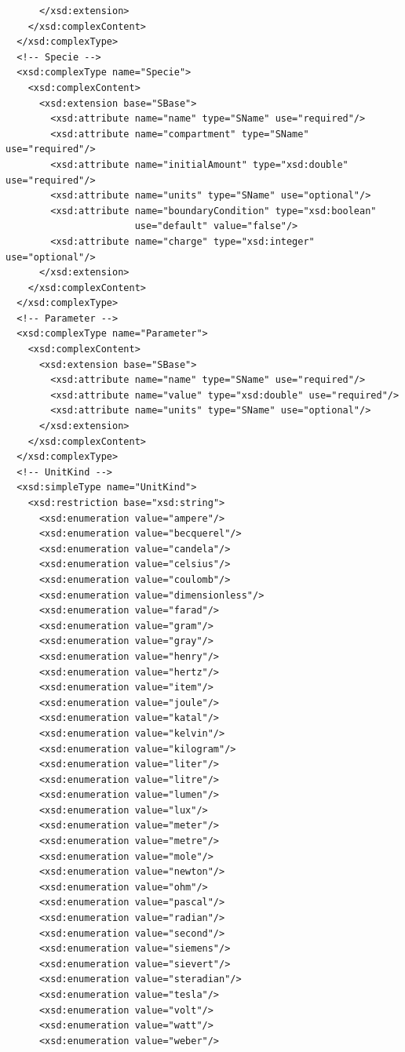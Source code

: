 \documentclass[10pt]{cekarticle}
\begin{document}
\begin{small}
\begin{verbatim}
      </xsd:extension>
    </xsd:complexContent>
  </xsd:complexType>
  <!-- Specie -->
  <xsd:complexType name="Specie">
    <xsd:complexContent>
      <xsd:extension base="SBase">
        <xsd:attribute name="name" type="SName" use="required"/>
        <xsd:attribute name="compartment" type="SName" use="required"/>
        <xsd:attribute name="initialAmount" type="xsd:double" use="required"/>
        <xsd:attribute name="units" type="SName" use="optional"/>
        <xsd:attribute name="boundaryCondition" type="xsd:boolean" 
                       use="default" value="false"/>
        <xsd:attribute name="charge" type="xsd:integer" use="optional"/>
      </xsd:extension>
    </xsd:complexContent>
  </xsd:complexType>
  <!-- Parameter -->
  <xsd:complexType name="Parameter">
    <xsd:complexContent>
      <xsd:extension base="SBase">
        <xsd:attribute name="name" type="SName" use="required"/>
        <xsd:attribute name="value" type="xsd:double" use="required"/>
        <xsd:attribute name="units" type="SName" use="optional"/>
      </xsd:extension>
    </xsd:complexContent>
  </xsd:complexType>
  <!-- UnitKind -->
  <xsd:simpleType name="UnitKind">
    <xsd:restriction base="xsd:string">
      <xsd:enumeration value="ampere"/>
      <xsd:enumeration value="becquerel"/>
      <xsd:enumeration value="candela"/>
      <xsd:enumeration value="celsius"/>
      <xsd:enumeration value="coulomb"/>
      <xsd:enumeration value="dimensionless"/>
      <xsd:enumeration value="farad"/>
      <xsd:enumeration value="gram"/>
      <xsd:enumeration value="gray"/>
      <xsd:enumeration value="henry"/>
      <xsd:enumeration value="hertz"/>
      <xsd:enumeration value="item"/>
      <xsd:enumeration value="joule"/>
      <xsd:enumeration value="katal"/>
      <xsd:enumeration value="kelvin"/>
      <xsd:enumeration value="kilogram"/>
      <xsd:enumeration value="liter"/>
      <xsd:enumeration value="litre"/>
      <xsd:enumeration value="lumen"/>
      <xsd:enumeration value="lux"/>
      <xsd:enumeration value="meter"/>
      <xsd:enumeration value="metre"/>
      <xsd:enumeration value="mole"/>
      <xsd:enumeration value="newton"/>
      <xsd:enumeration value="ohm"/>
      <xsd:enumeration value="pascal"/>
      <xsd:enumeration value="radian"/>
      <xsd:enumeration value="second"/>
      <xsd:enumeration value="siemens"/>
      <xsd:enumeration value="sievert"/>
      <xsd:enumeration value="steradian"/>
      <xsd:enumeration value="tesla"/>
      <xsd:enumeration value="volt"/>
      <xsd:enumeration value="watt"/>
      <xsd:enumeration value="weber"/>

\end{verbatim}
\end{small}
\end{document}
